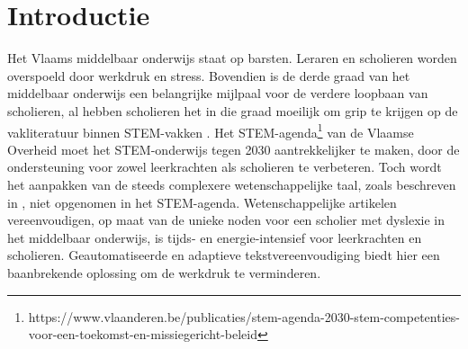 
\section{Introductie}%
\label{sec:introductie}


Het Vlaams middelbaar onderwijs staat op barsten. Leraren en scholieren worden overspoeld door werkdruk en stress. Bovendien is de derde graad van het middelbaar onderwijs een belangrijke mijlpaal voor de verdere loopbaan van scholieren, al hebben scholieren het in die graad moeilijk om grip te krijgen op de vakliteratuur binnen STEM-vakken \autocite{Dapaah2022}. Het STEM-agenda\footnote{https://www.vlaanderen.be/publicaties/stem-agenda-2030-stem-competenties-voor-een-toekomst-en-missiegericht-beleid} van de Vlaamse Overheid moet het STEM-onderwijs tegen 2030 aantrekkelijker te maken, door de ondersteuning voor zowel leerkrachten als scholieren te verbeteren. Toch wordt het aanpakken van de steeds complexere wetenschappelijke taal, zoals beschreven in \textcite{Barnett2020}, niet opgenomen in het STEM-agenda. Wetenschappelijke artikelen vereenvoudigen, op maat van de unieke noden voor een scholier met dyslexie in het middelbaar onderwijs, is tijds- en energie-intensief voor leerkrachten en scholieren. Geautomatiseerde en adaptieve tekstvereenvoudiging biedt hier een baanbrekende oplossing om de werkdruk te verminderen.


